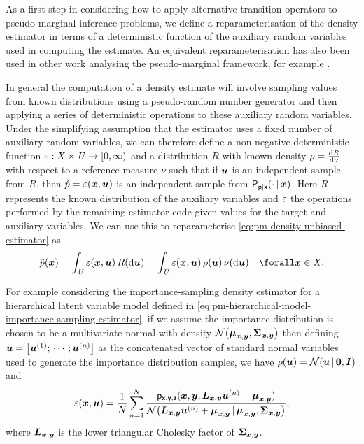 As a first step in considering how to apply alternative transition operators to pseudo-marginal inference problems, we define a reparameterisation of the density estimator in terms of a deterministic function of the auxiliary random variables used in computing the estimate. An equivalent reparameterisation has also been used in other work analysing the pseudo-marginal framework, for example \citep{doucet2015efficient}.

In general the computation of a density estimate will involve sampling values from known distributions using a pseudo-random number generator and then applying a series of deterministic operations to these auxiliary random variables. Under the simplifying assumption that the estimator uses a fixed number of auxiliary random variables, we can therefore define a non-negative deterministic function $\varepsilon : \mathit{X} \times \mathit{U} \to [0,\infty)$ and a distribution $R$ with known density $\rho = \frac{\mathrm{d} R}{\mathrm{d} \nu}$ with respect to a reference measure $\nu$ such that if $\boldsymbol{u}$ is an independent sample from $R$, then $\hat{p} = \varepsilon(\boldsymbol{x},\boldsymbol{u})$ is an independent sample from $\mathsf{P}_{\hat{\mathsf{p}}|\boldsymbol{\mathsf{x}}}( \cdot \operatorname{|} \boldsymbol{x})$. Here $R$ represents the known distribution of the auxiliary variables and $\varepsilon$ the operations performed by the remaining estimator code given values for the target and auxiliary variables. We can use this to reparameterise \eqref{eq:pm-density-unbiased-estimator} as
\begin{equation}\label{eq:density-unbiased-estimator-property}
  \utgtdens(\vct{x}) =
  \int_{\set{U}} \esttgtdens(\vct{x},\vct{u})\,R(\dr\vct{u}) =
  \int_{\set{U}} \esttgtdens(\vct{x},\vct{u})\,\rho(\vct{u})\,\nu(\dr\vct{u})
  \quad \forall \vct{x} \in \set{X}.
\end{equation}

For example considering the importance-sampling density estimator for a hierarchical latent variable model defined in \eqref{eq:pm-hierarchical-model-importance-sampling-estimator}, if we assume the importance distribution is chosen to be a multivariate normal with density $\nrm{\vct{\mu}_{\vct{x},\vct{y}},\mtx{\Sigma}_{\vct{x},\vct{y}}}$ then defining $\vct{u} = \lsb \vct{u}^{(1)}; \,\cdots\,; \vct{u}^{(n)}\rsb$ as the concatenated vector of standard normal variables used to generate the importance distribution samples, we have $\rho(\vct{u}) = \nrm{\vct{u}\gvn\vct{0},\mtx{I}}$ and
\begin{equation}\label{eq:importance-sampling-density-estimator-reparameterisation}
  \esttgtdens(\vct{x},\vct{u}) = \frac{1}{N} \sum_{n=1}^N
  \frac
    {\pden{\rvct{x},\rvct{y},\rvct{z}}(\vct{x},\vct{y},\mtx{L}_{\vct{x},\vct{y}}\vct{u}^{(n)} + \vct{\mu}_{\vct{x},\vct{y}})}
    {\nrm{\mtx{L}_{\vct{x},\vct{y}}\vct{u}^{(n)} + \vct{\mu}_{\vct{x},\vct{y}} \gvn \vct{\mu}_{\vct{x},\vct{y}},\mtx{\Sigma}_{\vct{x},\vct{y}}}},
\end{equation}
where $\boldsymbol{L}_{\boldsymbol{x},\boldsymbol{y}}$ is the lower triangular Cholesky factor of $\boldsymbol{\Sigma}_{\boldsymbol{x},\boldsymbol{y}}$.


